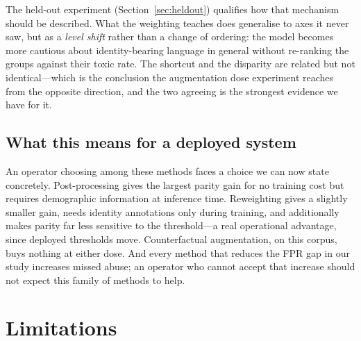 \documentclass[conference]{IEEEtran}
\begin{document}
The held-out experiment (Section~\ref{sec:heldout}) qualifies how that mechanism
should be described. What the weighting teaches does generalise to axes it never
saw, but as a \emph{level shift} rather than a change of ordering: the model
becomes more cautious about identity-bearing language in general without
re-ranking the groups against their toxic rate. The shortcut and the disparity
are related but not identical---which is the conclusion the augmentation dose
experiment reaches from the opposite direction, and the two agreeing is the
strongest evidence we have for it.

\subsection{What this means for a deployed system}
An operator choosing among these methods faces a choice we can now state
concretely. Post-processing gives the largest parity gain for no training cost
but requires demographic information at inference time. Reweighting gives a
slightly smaller gain, needs identity annotations only during training, and
additionally makes parity far less sensitive to the threshold---a real operational
advantage, since deployed thresholds move. Counterfactual augmentation, on this
corpus, buys nothing at either dose. And every method that reduces the FPR gap in
our study increases missed abuse; an operator who cannot accept that increase
should not expect this family of methods to help.

\section{Limitations}
\end{document}
